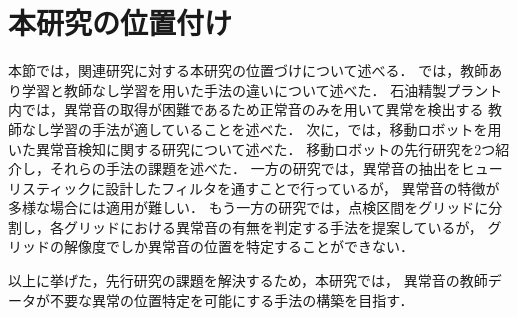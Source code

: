\documentclass[../main]{subfiles}
\begin{document}
\section{本研究の位置付け}
\label{sec:related_work_summary}

本節では，関連研究に対する本研究の位置づけについて述べる．
では，教師あり学習と教師なし学習を用いた手法の違いについて述べた．
石油精製プラント内では，異常音の取得が困難であるため正常音のみを用いて異常を検出する
教師なし学習の手法が適していることを述べた．
次に，では，移動ロボットを用いた異常音検知に関する研究について述べた．
移動ロボットの先行研究を2つ紹介し，それらの手法の課題を述べた．
一方の研究では，異常音の抽出をヒューリスティックに設計したフィルタを通すことで行っているが，
異常音の特徴が多様な場合には適用が難しい．
もう一方の研究では，点検区間をグリッドに分割し，各グリッドにおける異常音の有無を判定する手法を提案しているが，
グリッドの解像度でしか異常音の位置を特定することができない．

以上に挙げた，先行研究の課題を解決するため，本研究では，
異常音の教師データが不要な異常の位置特定を可能にする手法の構築を目指す．

\end{document}
